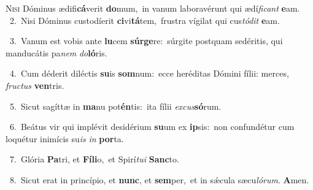 \lettrine{\initial\textcolor{\initialcolor}{N}}{isi} Dóminus ædifi\-\textbf{cá}\-verit \textbf{do}\-mum,~\star in vanum laboravérunt qui ædí\-\textit{fi}\-\textit{cant} \textbf{e}\-am.\\
{\numbfont\textcolor{\numbcolor}{~2.}}~Nisi Dóminus custodíerit \textbf{ci}\-vi\-\textbf{tá}\-tem,~\star frustra vígilat qui cus\-\textit{tó}\-\textit{dit} \textbf{e}\-am.\par
{\numbfont\textcolor{\numbcolor}{~3.}}~Vanum est vobis ante \textbf{lu}\-cem \textbf{súr}\-\textbf{ge}re:~\star súrgite postquam sedéritis, qui manducátis pa\textit{nem} \textit{do}\-\textbf{ló}ris.\par
{\numbfont\textcolor{\numbcolor}{~4.}}~Cum déderit diléctis \textbf{su}\-is \textbf{som}\-num:~\star ecce heréditas Dómini fílii: merces, \textit{fruc}\-\textit{tus} \textbf{ven}\-tris.\par
{\numbfont\textcolor{\numbcolor}{~5.}}~Sicut sagíttæ in \textbf{ma}\-nu pot\-\textbf{én}\-tis:~\star ita fílii \textit{ex}\-\textit{cus}\textbf{só}rum.\par
{\numbfont\textcolor{\numbcolor}{~6.}}~Beátus vir qui implévit desidérium \textbf{su}\-um ex \textbf{ip}\-sis:~\star non confundétur cum loquétur inimícis su\textit{is} \textit{in} \textbf{por}\-ta.\par
{\numbfont\textcolor{\numbcolor}{~7.}}~Glória \textbf{Pa}\-tri, et \textbf{Fí}\-\textbf{li}o,~\star et Spirí\-\textit{tu}\-\textit{i} \textbf{Sanc}\-to.\par
{\numbfont\textcolor{\numbcolor}{~8.}}~Sicut erat in princípio, et \textbf{nunc}\-, et \textbf{sem}\-per,~\star et in sǽcula sæcu\-\textit{ló}\-\textit{rum}. \textbf{A}\-men.\par
